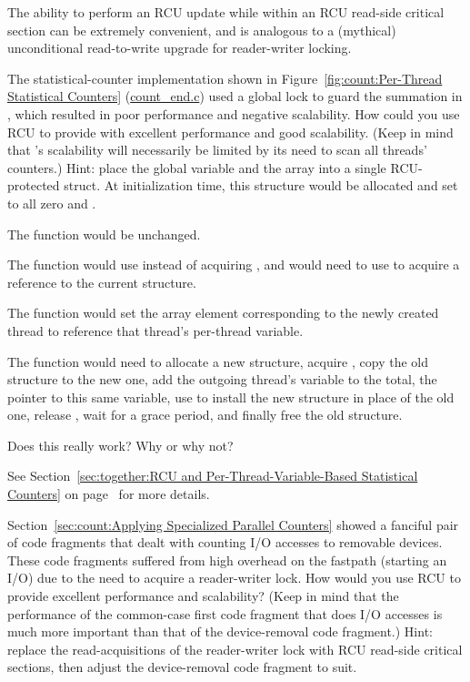 	The ability to perform an RCU update while within an RCU read-side
	critical section can be extremely convenient, and is analogous
	to a (mythical) unconditional read-to-write upgrade for
	reader-writer locking.

\QuickQ{}
	The statistical-counter implementation shown in
	Figure~\ref{fig:count:Per-Thread Statistical Counters}
	(\url{count_end.c})
	used a global lock to guard the summation in ,
	which resulted in poor performance and negative scalability.
	How could you use RCU to provide  with
	excellent performance and good scalability.
	(Keep in mind that 's scalability will
	necessarily be limited by its need to scan all threads'
	counters.)
\QuickA{}
	Hint: place the global variable  and the
	array  into a single RCU-protected struct.
	At initialization time, this structure would be allocated
	and set to all zero and .

	The  function would be unchanged.

	The  function would use 
	instead of acquiring , and would need to
	use  to acquire a reference to the
	current structure.

	The  function would set the
	array element corresponding to the newly created thread
	to reference that thread's per-thread  variable.

	The  function would need to
	allocate a new structure, acquire ,
	copy the old structure to the new one, add the outgoing
	thread's  variable to the total, 
	the pointer to this same  variable,
	use  to install the new structure
	in place of the old one, release ,
	wait for a grace period, and finally free the old structure.

	Does this really work?
	Why or why not?

	See
	Section~\ref{sec:together:RCU and Per-Thread-Variable-Based Statistical Counters}
	on
	page~\pageref{sec:together:RCU and Per-Thread-Variable-Based Statistical Counters}
	for more details.

\QuickQ{}
	Section~\ref{sec:count:Applying Specialized Parallel Counters}
	showed a fanciful pair of code fragments that dealt with counting
	I/O accesses to removable devices.
	These code fragments suffered from high overhead on the fastpath
	(starting an I/O) due to the need to acquire a reader-writer
	lock.
	How would you use RCU to provide excellent performance and
	scalability?
	(Keep in mind that the performance of the common-case first
	code fragment that does I/O accesses is much more important
	than that of the device-removal code fragment.)
\QuickA{}
	Hint: replace the read-acquisitions of the reader-writer lock
	with RCU read-side critical sections, then adjust the
	device-removal code fragment to suit.

